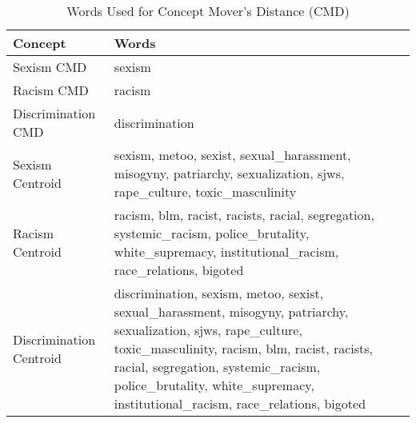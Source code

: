 \begin{table}[htb]
\caption{Words Used for Concept Mover's Distance (CMD)} 
\label{tab:CmdConcept}
\begin{tabulary}{\linewidth}{lL}
  \toprule
Concept & Words \\ 
  \midrule
Sexism CMD & sexism \\ 
  Racism CMD & racism \\ 
  Discrimination CMD & discrimination \\ 
  Sexism Centroid & sexism, metoo, sexist, sexual\_harassment, misogyny, patriarchy, sexualization, sjws, rape\_culture, toxic\_masculinity \\ 
  Racism Centroid & racism, blm, racist, racists, racial, segregation, systemic\_racism, police\_brutality, white\_supremacy, institutional\_racism, race\_relations, bigoted \\ 
  Discrimination Centroid & discrimination, sexism, metoo, sexist, sexual\_harassment, misogyny, patriarchy, sexualization, sjws, rape\_culture, toxic\_masculinity, racism, blm, racist, racists, racial, segregation, systemic\_racism, police\_brutality, white\_supremacy, institutional\_racism, race\_relations, bigoted \\ 
   \bottomrule
\end{tabulary}
\end{table}


